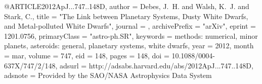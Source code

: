 @ARTICLE{2012ApJ...747..148D,
   author = {{Debes}, J.~H. and {Walsh}, K.~J. and {Stark}, C.},
    title = "{The Link between Planetary Systems, Dusty White Dwarfs, and Metal-polluted White Dwarfs}",
  journal = {\apj},
archivePrefix = "arXiv",
   eprint = {1201.0756},
 primaryClass = "astro-ph.SR",
 keywords = {methods: numerical, minor planets, asteroids: general, planetary systems, white dwarfs},
     year = 2012,
    month = mar,
   volume = 747,
      eid = {148},
    pages = {148},
      doi = {10.1088/0004-637X/747/2/148},
   adsurl = {http://adsabs.harvard.edu/abs/2012ApJ...747..148D},
  adsnote = {Provided by the SAO/NASA Astrophysics Data System}
}
